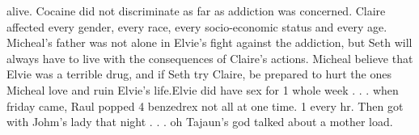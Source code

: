 \documentclass[12pt]{book}
\begin{document}
alive. Cocaine did not discriminate as far as addiction was concerned. Claire affected every gender, every race, every socio-economic status and every age. Micheal's father was not alone in Elvie's fight against the addiction, but Seth will always have to live with the consequences of Claire's actions. Micheal believe that Elvie was a terrible drug, and if Seth try Claire, be prepared to hurt the ones Micheal love and ruin Elvie's life.Elvie did have sex for 1 whole week . . .  when friday came, Raul popped 4 benzedrex not all at one time. 1 every hr. Then got with Johm's lady that night . . .  oh Tajaun's god talked about a mother load.
\end{document}
